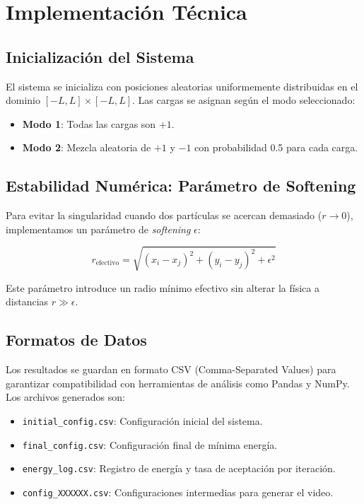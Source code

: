 \section{Implementación Técnica}

\subsection{Inicialización del Sistema}
El sistema se inicializa con posiciones aleatorias uniformemente distribuidas en el dominio \([-L, L] \times [-L, L]\). Las cargas se asignan según el modo seleccionado:
\begin{itemize}
    \item \textbf{Modo 1}: Todas las cargas son \(+1\).
    \item \textbf{Modo 2}: Mezcla aleatoria de \(+1\) y \(-1\) con probabilidad 0.5 para cada carga.
\end{itemize}

\subsection{Estabilidad Numérica: Parámetro de Softening}
Para evitar la singularidad cuando dos partículas se acercan demasiado (\(r \to 0\)), implementamos un parámetro de \textit{softening} \(\epsilon\):

\begin{equation}
    r_{\text{efectivo}} = \sqrt{(x_i - x_j)^2 + (y_i - y_j)^2 + \epsilon^2}
\end{equation}

Este parámetro introduce un radio mínimo efectivo sin alterar la física a distancias \(r \gg \epsilon\).

\subsection{Formatos de Datos}
Los resultados se guardan en formato CSV (Comma-Separated Values) para garantizar compatibilidad con herramientas de análisis como Pandas y NumPy. Los archivos generados son:
\begin{itemize}
    \item \texttt{initial\_config.csv}: Configuración inicial del sistema.
    \item \texttt{final\_config.csv}: Configuración final de mínima energía.
    \item \texttt{energy\_log.csv}: Registro de energía y tasa de aceptación por iteración.
    \item \texttt{config\_XXXXXX.csv}: Configuraciones intermedias para generar el video.
\end{itemize}

